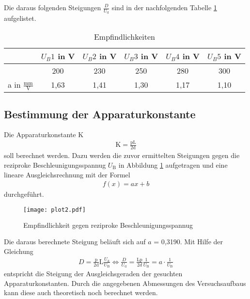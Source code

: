 \noindent
Die daraus folgenden Steigungen $\frac{D}{U_\text{d}}$ sind in der nachfolgenden Tabelle \ref{tab:messwerte2} aufgelistet.

\FloatBarrier
\begin{table}
  \centering
  \caption{Empfindlichkeiten}
  \label{tab:messwerte2}
  \begin{tabular}{c c c c c c}
  \toprule
   & $U_B 1$ in V & $U_B 2$ in V & $U_B 3$ in V & $U_B 4$ in V & $U_B 5$ in V \\
  \midrule
   & 200 & 230 & 250 & 280 & 300 \\
  \bottomrule
  a in $\frac{\text{mm}}{\text{V}}$ & 1,63 & 1,41 & 1,30 & 1,17 & 1,10 \\
  \bottomrule
\end{tabular}
\end{table}

\noindent

\subsection{Bestimmung der Apparaturkonstante}
\label{sec:Apparaturkonstante}

Die Apparaturkonstante K
\begin{align*}
  \text{K} = \frac{\text{pL}}{\text{2d}}
\end{align*}
\noindent 
soll berechnet werden.
Dazu werden die zuvor ermittelten Steigungen gegen die reziproke Beschleunigungsspannug $U_\text{B}$ in Abbildung \ref{fig:plot2} aufgetragen und eine lineare Ausgleichsrechnung mit der Formel
\begin{align*}
  f(x)=ax+b
\end{align*} 
\noindent 
durchgeführt.

\FloatBarrier
\begin{figure}
  \centering
  \texttt{[image: plot2.pdf]}
  \caption{Empfindlichkeit gegen reziproke Beschleunigungsspannug}
  \label{fig:plot2}
\end{figure}

\noindent
Die daraus berechnete Steigung beläuft sich auf $a$ = 0,3190.
Mit Hilfe der Gleichung
\begin{align*}
  D = \frac{\text{p}}{\text{2d}}\text{L}\frac{U_\text{d}}{U_\text{B}} \Leftrightarrow \frac{D}{U_\text{d}} = \frac{\text{Lp}}{2d} \frac{1}{U_\text{B}} = a \cdot \frac{1}{U_\text{B}}
\end{align*}
\noindent 
entspricht die Steigung der Ausgleichsgeraden der gesuchten Apparaturkonstanten.
Durch die angegebenen Abmessungen des Versuchsaufbaus kann diese auch theoretisch noch berechnet werden.


